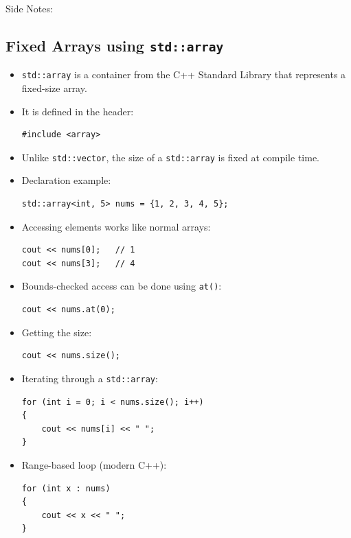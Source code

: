 \documentclass[10pt]{article}
\begin{document}
Side Notes:

\subsection*{Fixed Arrays using \texttt{std::array}}
\begin{itemize}
	\item \texttt{std::array} is a container from the C++ Standard Library that represents a fixed-size array.

	\item It is defined in the header:
	\begin{verbatim}
#include <array>
	\end{verbatim}

	\item Unlike \texttt{std::vector}, the size of a \texttt{std::array} is fixed at compile time.

	\item Declaration example:
	\begin{verbatim}
std::array<int, 5> nums = {1, 2, 3, 4, 5};
	\end{verbatim}

	\item Accessing elements works like normal arrays:
	\begin{verbatim}
cout << nums[0];   // 1
cout << nums[3];   // 4
	\end{verbatim}

	\item Bounds-checked access can be done using \texttt{at()}:
	\begin{verbatim}
cout << nums.at(0);
	\end{verbatim}

	\item Getting the size:
	\begin{verbatim}
cout << nums.size();
	\end{verbatim}

	\item Iterating through a \texttt{std::array}:
	\begin{verbatim}
for (int i = 0; i < nums.size(); i++)
{
    cout << nums[i] << " ";
}
	\end{verbatim}

	\item Range-based loop (modern C++):
	\begin{verbatim}
for (int x : nums)
{
    cout << x << " ";
}
	\end{verbatim}


\end{itemize}
\end{document}
